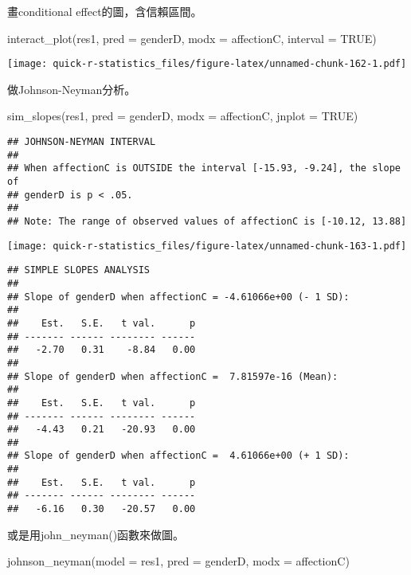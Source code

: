 \documentclass[
]{book}
\newenvironment{Shaded}{\begin{snugshade}}{\end{snugshade}}
\newcommand{\AttributeTok}[1]{\textcolor[rgb]{0.77,0.63,0.00}{#1}}
\newcommand{\ConstantTok}[1]{\textcolor[rgb]{0.00,0.00,0.00}{#1}}
\newcommand{\FunctionTok}[1]{\textcolor[rgb]{0.00,0.00,0.00}{#1}}
\newcommand{\NormalTok}[1]{#1}
\begin{document}
畫conditional effect的圖，含信賴區間。

\begin{Shaded}
\begin{Highlighting}[]
\FunctionTok{interact\_plot}\NormalTok{(res1, }\AttributeTok{pred =}\NormalTok{ genderD, }\AttributeTok{modx =}\NormalTok{ affectionC, }\AttributeTok{interval =} \ConstantTok{TRUE}\NormalTok{)}
\end{Highlighting}
\end{Shaded}

\texttt{[image: quick-r-statistics\_files/figure-latex/unnamed-chunk-162-1.pdf]}

做Johnson-Neyman分析。

\begin{Shaded}
\begin{Highlighting}[]
\FunctionTok{sim\_slopes}\NormalTok{(res1, }\AttributeTok{pred =}\NormalTok{ genderD, }\AttributeTok{modx =}\NormalTok{ affectionC, }\AttributeTok{jnplot =} \ConstantTok{TRUE}\NormalTok{)}
\end{Highlighting}
\end{Shaded}

\begin{verbatim}
## JOHNSON-NEYMAN INTERVAL 
## 
## When affectionC is OUTSIDE the interval [-15.93, -9.24], the slope of
## genderD is p < .05.
## 
## Note: The range of observed values of affectionC is [-10.12, 13.88]
\end{verbatim}

\texttt{[image: quick-r-statistics\_files/figure-latex/unnamed-chunk-163-1.pdf]}

\begin{verbatim}
## SIMPLE SLOPES ANALYSIS 
## 
## Slope of genderD when affectionC = -4.61066e+00 (- 1 SD): 
## 
##    Est.   S.E.   t val.      p
## ------- ------ -------- ------
##   -2.70   0.31    -8.84   0.00
## 
## Slope of genderD when affectionC =  7.81597e-16 (Mean): 
## 
##    Est.   S.E.   t val.      p
## ------- ------ -------- ------
##   -4.43   0.21   -20.93   0.00
## 
## Slope of genderD when affectionC =  4.61066e+00 (+ 1 SD): 
## 
##    Est.   S.E.   t val.      p
## ------- ------ -------- ------
##   -6.16   0.30   -20.57   0.00
\end{verbatim}

或是用john\_neyman()函數來做圖。

\begin{Shaded}
\begin{Highlighting}[]
\FunctionTok{johnson\_neyman}\NormalTok{(}\AttributeTok{model =}\NormalTok{ res1, }\AttributeTok{pred =}\NormalTok{ genderD, }\AttributeTok{modx =}\NormalTok{ affectionC)}
\end{Highlighting}
\end{Shaded}
\end{document}

